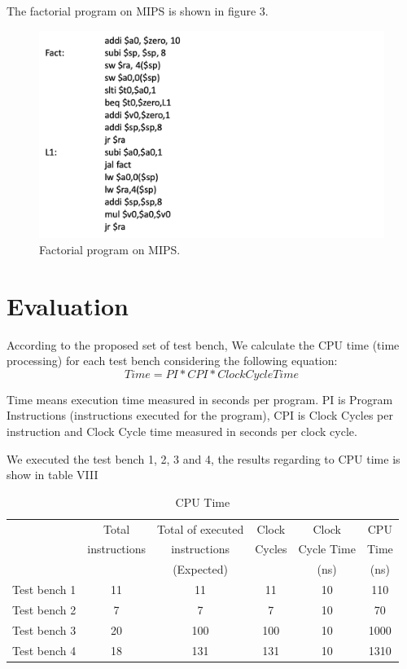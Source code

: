 \documentclass[conference]{IEEEtran}
\begin{document}
The factorial program on MIPS is shown in figure 3.
\begin{figure}[h]
\begin{center}
\includegraphics[scale=0.45]{MIPS_Factorial.png}
\caption{Factorial program on MIPS.}
\label{fact_mips}
\end{center}
\end{figure}
 
\section{Evaluation}

According to the proposed set of test bench, We calculate the CPU time \cite{b5} (time processing) for each test bench considering the following equation:
\[Time = PI * CPI * Clock Cycle Time\] 

Time means execution time measured in seconds per program. PI is Program Instructions (instructions executed for the program), CPI is Clock Cycles per instruction and Clock Cycle time measured in seconds per clock cycle.

We executed the test bench 1, 2, 3 and 4, the results regarding to CPU time is show in table VIII

\begin{table}[h]
	\caption{CPU Time} %
	\begin{center}
		\begin{tabular}{|c|c|c|c|c|c|}
			\hline
			&Total&Total of executed&Clock&Clock&CPU\\
			&instructions&instructions&Cycles&Cycle Time&Time\\
			&&(Expected)&&(ns)&(ns)\\
			\hline
			Test bench 1&11&11&11&10&110\\
			\hline
			Test bench 2&7&7&7&10&70\\
			\hline
			Test bench 3&20&100&100&10&1000\\
			\hline
			Test bench 4&18&131&131&10&1310\\
			\hline
		\end{tabular}
		\label{tab_test3}
	\end{center}
\end{table}
\end{document}
